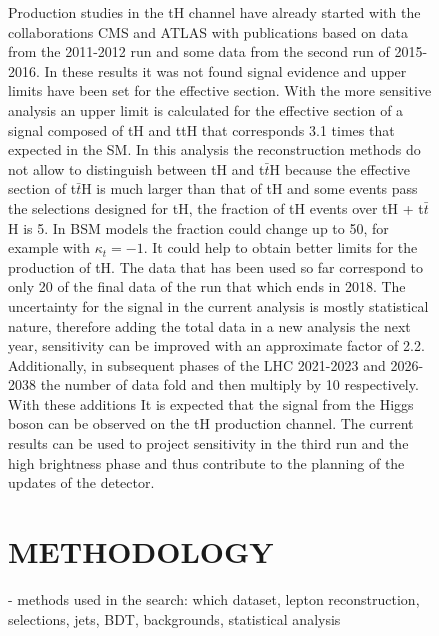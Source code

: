 \documentclass[final,3p]{CSP}
\begin{document}
\begin{figure}
Production studies in the tH channel have already started with the collaborations CMS and 
ATLAS with publications based on data from the 2011-2012 run and some data from the second 
run of 2015-2016. In these results it was not found signal evidence and upper limits have 
been set for the effective section. With the more sensitive analysis an upper limit is 
calculated for the effective section of a signal composed of tH and ttH that corresponds 3.1 
times that expected in the SM. In this analysis the reconstruction methods do not allow to 
distinguish between tH and t$\bar{t}$H because the effective section of t$\bar{t}$H is much 
larger than that of tH and some events pass the selections designed for tH, the fraction of 
tH events over tH + t$\bar{t}$H is 5. In BSM models the fraction could change up to 50, for 
example with $\kappa_t = -1$. It could help to obtain better limits for the production of tH. 
The data that has been used so far correspond to only 20 of the final data of the run that 
which ends in 2018. The uncertainty for the signal in the current analysis is mostly 
statistical nature, therefore adding the total data in a new analysis the next year, 
sensitivity can be improved with an approximate factor of 2.2. Additionally, in subsequent 
phases of the LHC 2021-2023 and 2026-2038 the number of data fold and then multiply by 10 
respectively. With these additions It is expected that the signal from the Higgs boson can be 
observed on the tH production channel. The current results can be used to project sensitivity 
in the third run and the high brightness phase and thus contribute to the planning of the 
updates of the detector.

\section{METHODOLOGY}
- methods used in the search: which dataset,  lepton reconstruction, selections, jets, BDT, backgrounds, statistical analysis


\end{figure}
\end{document}
